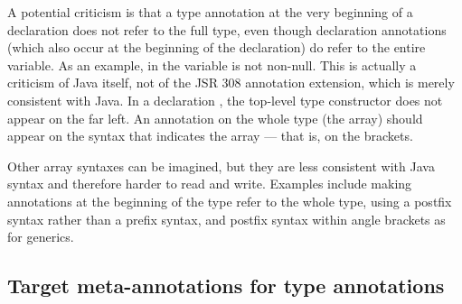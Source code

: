 \documentclass[10pt]{article}
\begin{document}


A potential criticism is that a type annotation at the very beginning of a
declaration does not refer to the full type, even though declaration
annotations (which also occur at the beginning of
the declaration) do refer to the entire variable.  As an example, in
 the variable  is not non-null.
This is actually a criticism of Java itself, not of the JSR 308
annotation extension, which is merely consistent with Java.  In a
declaration , the top-level type constructor does not
appear on the far left.  An annotation on the whole type (the array) should
appear on the syntax that indicates the array --- that is, on the brackets.


Other array syntaxes can be imagined, but they are less consistent with
Java syntax and therefore harder to read and write.
Examples include
making annotations at the beginning of the type refer to the whole type,
using a postfix syntax rather than a prefix syntax, and postfix syntax
within angle brackets as for generics.








\subsection{Target meta-annotations for type annotations\label{target-meta-annotation}}
\end{document}
